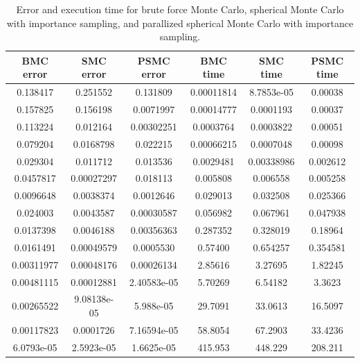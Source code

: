 \documentclass{article}
\begin{document}
    \begin{table}[ht] \label{tab:error-MonteCarlo}
    \centering
      \caption{Error and execution time for brute force Monte Carlo, spherical Monte Carlo with importance sampling, and parallized spherical Monte Carlo with importance sampling.}
      \vspace{2mm}
      \begin{tabular}{|c|c|c|c|c|c|}
        \hline
        BMC error & SMC error & PSMC error & BMC time & SMC time & PSMC time  \\
        \hline \hline
        0.138417 & 0.251552 & 0.131809 & 0.00011814 & 8.7853e-05 & 0.00038 \\
        0.157825 & 0.156198 & 0.0071997 & 0.00014777 & 0.0001193 & 0.00037 \\
        0.113224 & 0.012164 & 0.00302251 & 0.0003764 & 0.0003822 & 0.00051 \\
        0.079204 & 0.0168798 & 0.022215 & 0.00066215 & 0.0007048 & 0.00098 \\
        0.029304 & 0.011712 & 0.013536 & 0.0029481 & 0.00338986 & 0.002612 \\
        0.0457817 & 0.00027297 & 0.018113 & 0.005808 & 0.006558 & 0.005258 \\
        0.0096648 & 0.0038374 & 0.0012646 & 0.029013 & 0.032508 & 0.025366 \\
        0.024003 & 0.0043587 & 0.00030587 & 0.056982 & 0.067961 & 0.047938 \\
        0.0137398 & 0.0046188 & 0.00356363 & 0.287352 & 0.328019 & 0.18964 \\
        0.0161491 & 0.00049579 & 0.0005530 & 0.57400 & 0.654257 & 0.354581 \\
        0.00311977 & 0.00048176 & 0.00026134 & 2.85616 & 3.27695 & 1.82245 \\
        0.00481115 & 0.00012881 & 2.40583e-05 & 5.70269 & 6.54182 & 3.3623 \\
        0.00265522 & 9.08138e-05 & 5.988e-05 & 29.7091 & 33.0613 & 16.5097 \\
        0.00117823 & 0.0001726 & 7.16594e-05 & 58.8054 & 67.2903 & 33.4236 \\
        6.0793e-05 & 2.5923e-05 & 1.6625e-05 & 415.953 & 448.229 & 208.211 \\
        \hline
      \end{tabular} \\
      \hspace{0pt}\\
  \end{table}
\end{document}
